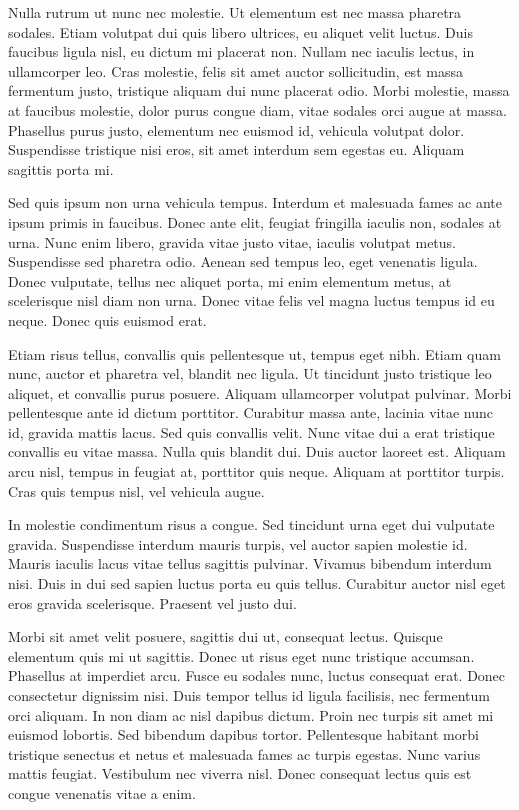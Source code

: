 \documentclass[2pt,a4paper,twoside ]{article}
\begin{document}
\begin{multicols}{2}
Nulla rutrum ut nunc nec molestie. Ut elementum est nec massa pharetra sodales. Etiam volutpat dui quis libero ultrices, eu aliquet velit luctus. Duis faucibus ligula nisl, eu dictum mi placerat non. Nullam nec iaculis lectus, in ullamcorper leo. Cras molestie, felis sit amet auctor sollicitudin, est massa fermentum justo, tristique aliquam dui nunc placerat odio. Morbi molestie, massa at faucibus molestie, dolor purus congue diam, vitae sodales orci augue at massa. Phasellus purus justo, elementum nec euismod id, vehicula volutpat dolor. Suspendisse tristique nisi eros, sit amet interdum sem egestas eu. Aliquam sagittis porta mi.

Sed quis ipsum non urna vehicula tempus. Interdum et malesuada fames ac ante ipsum primis in faucibus. Donec ante elit, feugiat fringilla iaculis non, sodales at urna. Nunc enim libero, gravida vitae justo vitae, iaculis volutpat metus. Suspendisse sed pharetra odio. Aenean sed tempus leo, eget venenatis ligula. Donec vulputate, tellus nec aliquet porta, mi enim elementum metus, at scelerisque nisl diam non urna. Donec vitae felis vel magna luctus tempus id eu neque. Donec quis euismod erat.

Etiam risus tellus, convallis quis pellentesque ut, tempus eget nibh. Etiam quam nunc, auctor et pharetra vel, blandit nec ligula. Ut tincidunt justo tristique leo aliquet, et convallis purus posuere. Aliquam ullamcorper volutpat pulvinar. Morbi pellentesque ante id dictum porttitor. Curabitur massa ante, lacinia vitae nunc id, gravida mattis lacus. Sed quis convallis velit. Nunc vitae dui a erat tristique convallis eu vitae massa. Nulla quis blandit dui. Duis auctor laoreet est. Aliquam arcu nisl, tempus in feugiat at, porttitor quis neque. Aliquam at porttitor turpis. Cras quis tempus nisl, vel vehicula augue.

In molestie condimentum risus a congue. Sed tincidunt urna eget dui vulputate gravida. Suspendisse interdum mauris turpis, vel auctor sapien molestie id. Mauris iaculis lacus vitae tellus sagittis pulvinar. Vivamus bibendum interdum nisi. Duis in dui sed sapien luctus porta eu quis tellus. Curabitur auctor nisl eget eros gravida scelerisque. Praesent vel justo dui.

Morbi sit amet velit posuere, sagittis dui ut, consequat lectus. Quisque elementum quis mi ut sagittis. Donec ut risus eget nunc tristique accumsan. Phasellus at imperdiet arcu. Fusce eu sodales nunc, luctus consequat erat. Donec consectetur dignissim nisi. Duis tempor tellus id ligula facilisis, nec fermentum orci aliquam. In non diam ac nisl dapibus dictum. Proin nec turpis sit amet mi euismod lobortis. Sed bibendum dapibus tortor. Pellentesque habitant morbi tristique senectus et netus et malesuada fames ac turpis egestas. Nunc varius mattis feugiat. Vestibulum nec viverra nisl. Donec consequat lectus quis est congue venenatis vitae a enim.


\end{multicols}
\end{document}
